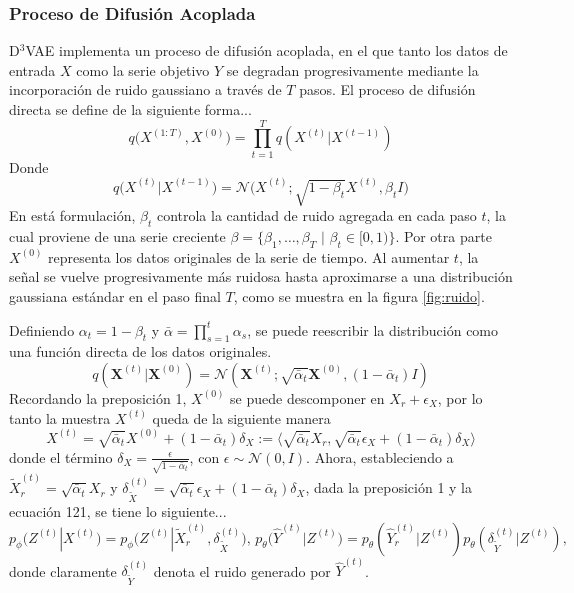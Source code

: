 \documentclass[12pt,letterpaper]{article}
\begin{document}
\subsubsection{Proceso de Difusión Acoplada}
D$^3$VAE implementa un proceso de difusión acoplada, en el que tanto los datos de entrada $X$ como la serie objetivo $Y$ se degradan progresivamente mediante la incorporación de ruido gaussiano a través de $T$ pasos. El proceso de difusión directa se define de la siguiente forma...
\begin{equation}
    q\big(X^{(1:T)}, X^{(0)}\big) = \prod_{t=1}^{T} q(X^{(t)}| X^{(t-1)})
\end{equation}
Donde
\begin{equation}
    q\big( X^{(t)} |X^{(t-1)} \big) = \mathcal{N}\big(X^{(t)};\sqrt{1-\beta_t}X^{(t)}, \beta_t I \big)
\end{equation}
En está formulación, $\beta_t$ controla la cantidad de ruido agregada en cada paso $t$, la cual proviene de una serie creciente $\beta = \{ \beta_1, \dots, \beta_T \,\,| \,\, \beta_t \in [0,1)\}$. Por otra parte $X^{(0)}$ representa los datos originales de la serie de tiempo. Al aumentar $t$, la señal se vuelve progresivamente más ruidosa hasta aproximarse a una distribución gaussiana estándar en el paso final $T$, como se muestra en la figura \ref{fig:ruido}.

Definiendo $\alpha_t=1-\beta_t$ y $\bar{\alpha}=\prod_{s=1}^{t} \alpha_s$, se puede reescribir la distribución como una función directa de los datos originales. 
\begin{equation} q(\mathbf{X}^{(t)} | \mathbf{X}^{(0)}) = \mathcal{N}(\mathbf{X}^{(t)}; \sqrt{\bar{\alpha}_t} \mathbf{X}^{(0)}, (1 - \bar{\alpha}_t) I) \end{equation}
Recordando la preposición 1, $X^{(0)}$ se puede descomponer en $X_r + \epsilon_X$, por lo tanto la muestra $X^{(t)}$ queda de la siguiente manera
\begin{equation}
    X^{(t)}=\sqrt{\bar{\alpha}_t}X^{(0)}+(1-\bar{\alpha}_t)\delta_X:=\big\langle \sqrt{\bar{\alpha}_t}X_r , \sqrt{\bar{\alpha}_t} \epsilon_X +(1-\bar{\alpha}_t)\delta_X \big\rangle
\end{equation}
donde el término $\delta_X=\frac{\epsilon}{\sqrt{1-\bar{\alpha}_t}}$, con $\epsilon \sim \mathcal{N}(0,I)$.
Ahora, estableciendo a $\tilde{X}_r^{(t)}= \sqrt{\bar{\alpha}_t}X_r$ y $\delta_{\tilde{X}}^{(t)}=\sqrt{\bar{\alpha}_t} \epsilon_X +(1-\bar{\alpha}_t)\delta_X$, dada la preposición 1 y la ecuación 121, se tiene lo siguiente...
\begin{equation}
    p_{\phi}\big(Z^{(t)}| X^{(t)}\big)=p_\phi\big(Z^{(t)}|\tilde{X}_r^{(t)},\delta_{\tilde{X}}^{(t)}\big), \, p_\theta\big( \hat{Y}^{(t)} |Z^{(t)}\big)= p_\theta(\hat{Y}_r^{(t)}|Z^{(t)}) p_\theta( \delta_{\tilde{Y}}^{(t)}|Z^{(t)}),
\end{equation}
donde claramente $\delta_{\tilde{Y}}^{(t)}$ denota el ruido generado por $\hat{Y}^{(t)}$.
\end{document}
